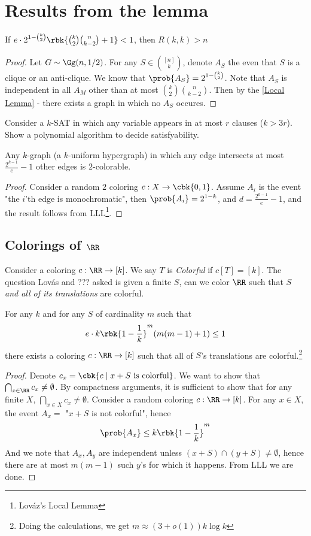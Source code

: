 \documentclass[a4paper, 11pt, oneside]{book}
\begin{document}
\section{Results from the lemma}
\begin{thm}
	 If $e\cdot 2^{1-{k\choose 2}}\rbk{{k\choose 2}{n\choose k-2} + 1}<1$, then $R(k,k) > n$
\end{thm}
\begin{proof}
	Let $G\sim \Gg(n,1/2)$. For any $S\in {[n]\choose k}$, denote $A_S$ the even that $S$ is a clique or an anti-clique. We know that $\prob{A_S} = 2^{1-{k\choose 2}}$. Note that $A_S$ is independent in all  $A_M$ other than at most $ {k\choose 2}{n\choose k-2}$. Then by the \autoref{Local Lemma} - there exists a graph in which no $A_S$ occures. 
\end{proof}
\begin{exercise}
Consider a $k$-SAT in which any variable appears in at most $r$ clauses ($k>3r$). Show a polynomial algorithm to decide satisfyability.
\end{exercise}
\begin{thm}
	Any $k$-graph (a $k$-uniform hypergraph) in which any edge intersects at most $\frac{2^{k-1}}{e} - 1$ other edges is $2$-colorable.
\end{thm}
\begin{proof}
	Consider a random $2$ coloring $c: X\to \cbk{0,1}$. Assume $A_i$ is the event "the $i$'th edge is monochromatic", then $\prob{A_i} = 2^{1-k}$, and $d = \frac{2^{k-1}}{e}-1$, and the result follows from LLL\footnote{Lov\'az's Local Lemma}.
\end{proof}
\subsection{Colorings of $\RR$}
Consider a coloring $c:\RR\to [k]$. We say $T$ is \emph{Colorful} if $c[T] = [k]$. The question Lov\'{a}s and ??? asked is given a finite $S$, can we color $\RR$ such that $S$ \emph{and all of its translations} are colorful.
\begin{thm}
	For any $k$ and for any $S$ of cardinality $m$ such that $$e\cdot k\rbk{1-\frac{1}{k}}^m(m(m-1)+1)\le 1$$  there exists a coloring $c:\RR\to [k]$ such that all of $S$'s translations are colorful.\footnote{Doing the calculations, we get $m \approx(3+o(1))k\log k$}
\end{thm}
\begin{proof}
	Denote $c_x = \cbk{c\mid x + S \text{ is colorful}}$. We want to show that $\bigcap_{x\in \RR} c_x \neq \emptyset$. By compactness arguments, it is sufficient to show that for any finite $X$, $\bigcap_{x\in X}c_x \neq \emptyset$. Consider a random coloring $c:\RR\to [k]$. For any $x\in X$, the event $A_x = $ "$x+S$ is not colorful", hence 
	\[
	\prob{A_x}\le k\rbk{1-\frac{1}{k}}^m
	\]
	And we note that $A_x,A_y$ are independent unless $(x+S)\cap (y+S) \neq \emptyset$, hence there are at most $m(m-1)$ such $y$'s for which it happens. From LLL we are done.
\end{proof}
\end{document}
